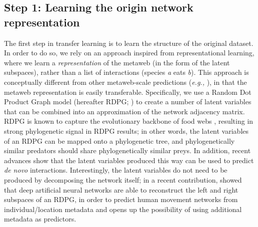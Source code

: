 \subsection{Step 1: Learning the origin network
representation}\label{step-1-learning-the-origin-network-representation}

The first step in transfer learning is to learn the structure of the
original dataset. In order to do so, we rely on an approach inspired
from representational learning, where we learn a \emph{representation}
of the metaweb (in the form of the latent subspaces), rather than a list
of interactions (species \emph{a} eats \emph{b}). This approach is
conceptually different from other metaweb-scale predictions (\emph{e.g.,}
\cite{Albouy2019MarFis}), in that the metaweb representation is easily
transferable. Specifically, we use a Random Dot Product Graph model
(hereafter RDPG; \cite{Young2007RanDot}) to create a number of latent
variables that can be combined into an approximation of the network
adjacency matrix. RDPG is known to capture the evolutionary backbone of
food webs \cite{DallaRiva2016ExpEvo}, resulting in strong phylogenetic
signal in RDPG results; in other words, the latent variables of an RDPG
can be mapped onto a phylogenetic tree, and phylogenetically similar
predators should share phylogenetically similar preys. In addition,
recent advances show that the latent variables produced this way can be
used to predict \emph{de novo} interactions. Interestingly, the latent
variables do not need to be produced by decomposing the network itself;
in a recent contribution, \cite{Runghen2021ExpNod} showed that deep artificial
neural networks are able to reconstruct the left and right subspaces of
an RDPG, in order to predict human movement networks from
individual/location metadata and opens up the possibility of using
additional metadata as predictors.

